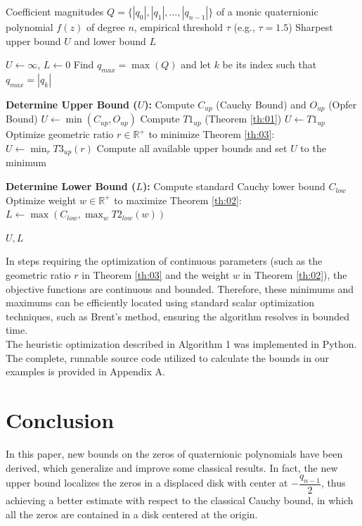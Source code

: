 \documentclass [12pt]{article}
\begin{document}
\begin{algorithm}
	\caption{Heuristic Bound Optimizer for Quaternionic Polynomials}
	\begin{algorithmic}[1] %
		\Require Coefficient magnitudes $Q = \{|q_0|, |q_1|, \dots, |q_{n-1}|\}$ of a monic quaternionic polynomial $f(z)$ of degree $n$, empirical threshold $\tau$ (e.g., $\tau = 1.5$)
		\Ensure Sharpest upper bound $U$ and lower bound $L$
		
		\State $U \gets \infty$, $L \gets 0$
		\State Find $q_{max} = \max(Q)$ and let $k$ be its index such that $q_{max} = |q_k|$
		
		\Statex \textbf{Determine Upper Bound ($U$):}
		 
		\State Compute $C_{up}$ (Cauchy Bound) and $O_{up}$ (Opfer Bound)
		\State $U \gets \min(C_{up}, O_{up})$
		 
		\State Compute $T1_{up}$ (Theorem \ref{th:01})
		\State $U \gets T1_{up}$
		 
		\State Optimize geometric ratio $r \in \mathbb{R}^+$ to minimize Theorem \ref{th:03}:
		\State $U \gets \min_{r} T3_{up}(r)$
		\Else {}
		\State Compute all available upper bounds and set $U$ to the minimum
		\EndIf
		
		\Statex \textbf{Determine Lower Bound ($L$):}
		\State Compute standard Cauchy lower bound $C_{low}$
		\State Optimize weight $w \in \mathbb{R}^+$ to maximize Theorem \ref{th:02}:
		\State $L \gets \max(C_{low}, \max_{w} T2_{low}(w))$
		
		\State \Return $U, L$
	\end{algorithmic}
\end{algorithm}

In steps requiring the optimization of continuous parameters (such as the geometric ratio $r$ in Theorem \ref{th:03} and the weight $w$ in Theorem \ref{th:02}), the objective functions are continuous and bounded. Therefore, these minimums and maximums can be efficiently located using standard scalar optimization techniques, such as Brent's method, ensuring the algorithm resolves in bounded time.\\

The heuristic optimization described in Algorithm 1 was implemented in Python. The complete, runnable source code utilized to calculate the bounds in our examples is provided in Appendix A.
\section{Conclusion} 
In this paper, new bounds on the zeros of quaternionic polynomials have been derived, which generalize and improve some classical results. In fact, the new upper bound localizes the zeros in a displaced disk with center at $-\dfrac{q_{n-1}}{2}$, thus achieving a better estimate with respect to the classical Cauchy bound, in which all the zeros are contained in a disk centered at the origin.
\end{document}
